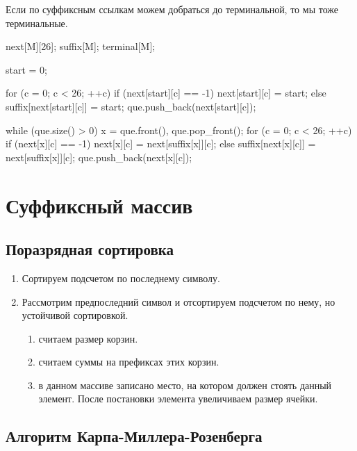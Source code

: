 Если по суффиксным ссылкам можем добраться до терминальной, то мы тоже терминальные.

\begin{cppcode}
next[M][26];
suffix[M];
terminal[M];

start = 0;

for (c = 0; c < 26; ++c) {
    if (next[start][c] == -1) {
        next[start][c] = start;
    } else {
        suffix[next[start][c]] = start;
        que.push_back(next[start][c]);
    }
}

while (que.size() > 0) {
    x = que.front(), que.pop_front();
    for (c = 0; c < 26; ++c) {
        if (next[x][c] == -1) {
            next[x][c] = next[suffix[x]][c];
        } else {
            suffix[next[x][c]] = next[suffix[x]][c];
            que.push_back(next[x][c]);
        }
    }
}
\end{cppcode}     

\section{Суффиксный массив}
\subsection{Поразрядная сортировка}
\begin{enumerate}
    \item Сортируем подсчетом по последнему символу.
    \item Рассмотрим предпоследний символ и отсортируем подсчетом по нему, 
    но устойчивой сортировкой. 
    \begin{enumerate}
    \item считаем размер корзин.
    \item считаем суммы на префиксах этих корзин.
    \item в данном массиве записано место, на котором должен стоять данный элемент.
    После постановки элемента увеличиваем размер ячейки. 
    \end{enumerate}

\end{enumerate}   

\subsection{Алгоритм Карпа-Миллера-Розенберга}

